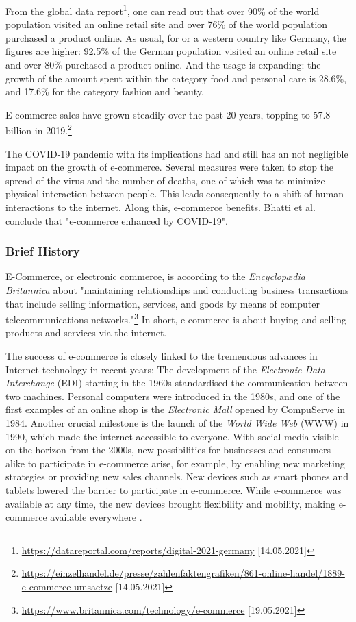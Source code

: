 From the global data report\footnote{\url{https://datareportal.com/reports/digital-2021-germany} [14.05.2021]}, one can read out that over 90\% of the world population visited an online retail site and over 76\% of the world population purchased a product online.
As usual, for or a western country like Germany, the figures are higher:
92.5\% of the German population visited an online retail site and over 80\% purchased a product online.
And the usage is expanding: the growth of the amount spent within the category food and personal care is 28.6\%, and 17.6\% for the category fashion and beauty.

E-commerce sales have grown steadily over the past 20 years, topping to 57.8 billion in 2019.\footnote{\url{https://einzelhandel.de/presse/zahlenfaktengrafiken/861-online-handel/1889-e-commerce-umsaetze} [14.05.2021]}

The COVID-19 pandemic with its implications had and still has an not negligible impact on the growth of e-commerce.
Several measures were taken to stop the spread of the virus and the number of deaths, one of which was to minimize physical interaction between people.
This leads consequently to a shift of human interactions to the internet.
Along this, e-commerce benefits.
Bhatti et al. \cite{2020Bhatti} conclude that "e-commerce enhanced by COVID-19".



\subsubsection{Brief History}

E-Commerce, or electronic commerce, is according to the \textit{Encyclopædia Britannica} about "maintaining relationships and conducting business transactions that include selling information, services, and goods by means of computer telecommunications networks."\footnote{\url{https://www.britannica.com/technology/e-commerce} [19.05.2021]}
In short, e-commerce is about buying and selling products and services via the internet.


The success of e-commerce is closely linked to the tremendous advances in Internet technology in recent years:
The development of the \textit{Electronic Data Interchange} (EDI) starting in the 1960s standardised the communication between two machines.
Personal computers were introduced in the 1980s, and one of the first examples of an online shop is the \textit{Electronic Mall} opened by CompuServe in 1984.
Another crucial milestone is the launch of the \textit{World Wide Web} (WWW) in 1990, which made the internet accessible to everyone.
With social media visible on the horizon from the 2000s, new possibilities for businesses and consumers alike to participate in e-commerce arise, for example, by enabling new marketing strategies or providing new sales channels.
New devices such as smart phones and tablets lowered the barrier to participate in e-commerce.
While e-commerce was available at any time, the new devices brought flexibility and mobility, making e-commerce available everywhere \cite{2019Hermogeno}.

